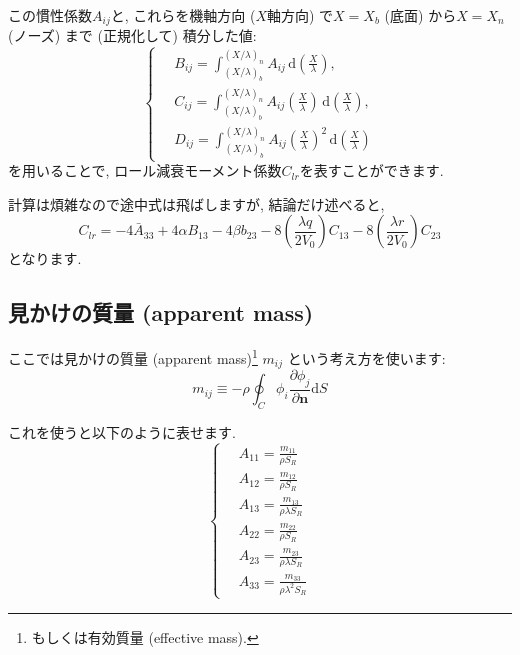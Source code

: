 \documentclass[uplatex,dvipdfmx,a4j,11  pt]{jsarticle}
\newcommand{\diff}{\mathrm{d}} %
\begin{document}
この慣性係数$A_{ij}$と, これらを機軸方向 ($X$軸方向) で$X = X_b$ (底面) から$X = X_n$ (ノーズ) まで (正規化して) 積分した値:
\begin{equation}
  \left\{ 
  \begin{alignedat}{2}  
    \,&B_{ij} = \int_{(X/\lambda)_b}^{(X/\lambda)_n} A_{ij}\,\diff\left(\frac{X}{\lambda}\right),\\
    \,&C_{ij} = \int_{(X/\lambda)_b}^{(X/\lambda)_n} A_{ij}\left(\frac{X}{\lambda}\right)\,\diff\left(\frac{X}{\lambda}\right),\\
    \,&D_{ij} = \int_{(X/\lambda)_b}^{(X/\lambda)_n} A_{ij}\left(\frac{X}{\lambda}\right)^2\,\diff\left(\frac{X}{\lambda}\right)
  \end{alignedat} 
  \right.
\end{equation}
を用いることで, ロール減衰モーメント係数$C_{lr}$を表すことができます.

計算は煩雑なので途中式は飛ばしますが, 結論だけ述べると,
\begin{equation}
  C_{lr} = -4 \bar{A}_{33} + 4 \alpha B_{13} - 4 \beta b_{23} - 8 \left(\frac{\lambda q}{2 V_0}\right) C_{13} - 8 \left(\frac{\lambda r}{2V_0}\right) C_{23}
\end{equation}
となります.

\subsection{見かけの質量 (apparent mass)}

ここでは見かけの質量 (apparent mass)\footnote{もしくは有効質量 (effective mass).} $m_{ij}$ という考え方を使います:
\begin{equation}
  m_{ij} \equiv -\rho\oint_C \phi_i \frac{\partial \phi_j}{\partial\mathbf{n}}\diff S
\end{equation}

これを使うと以下のように表せます.
\begin{equation}
  \left\{ 
  \begin{alignedat}{2}
    \,&A_{11} = \frac{m_{11}}{\rho S_R}\\
    \,&A_{12} = \frac{m_{12}}{\rho S_R}\\
    \,&A_{13} = \frac{m_{13}}{\rho \lambda S_R}\\
    \,&A_{22} = \frac{m_{22}}{\rho S_R}\\
    \,&A_{23} = \frac{m_{23}}{\rho \lambda S_R}\\
    \,&A_{33} = \frac{m_{33}}{\rho \lambda^2 S_R}
  \end{alignedat} 
  \right.
\end{equation}
\end{document}
